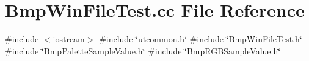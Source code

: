 \section{Bmp\+Win\+File\+Test.\+cc File Reference}
\label{BmpWinFileTest_8cc}
{\ttfamily \#include $<$iostream$>$}\newline
{\ttfamily \#include \char`\"{}utcommon.\+h\char`\"{}}\newline
{\ttfamily \#include \char`\"{}Bmp\+Win\+File\+Test.\+h\char`\"{}}\newline
{\ttfamily \#include \char`\"{}Bmp\+Palette\+Sample\+Value.\+h\char`\"{}}\newline
{\ttfamily \#include \char`\"{}Bmp\+R\+G\+B\+Sample\+Value.\+h\char`\"{}}\newline
